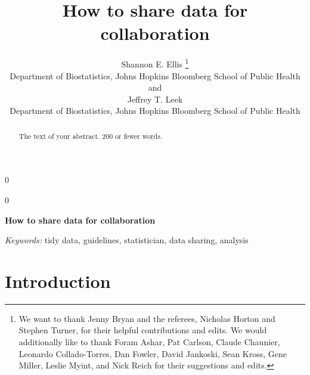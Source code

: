 \documentclass[12pt]{article}
\newcommand{\blind}{0}
\begin{document}
\def\spacingset#1{\renewcommand{\baselinestretch}%
{#1}\small\normalsize} \spacingset{1}



\blind
{
  \title{\bf How to share data for collaboration}

  \author{
        Shannon E. Ellis \thanks{We want to thank Jenny Bryan and the referees, Nicholas Horton and
Stephen Turner, for their helpful contributions and edits. We would
additionally like to thank Foram Ashar, Pat Carlson, Claude Chaunier,
Leonardo Collado-Torres, Dan Fowler, David Jankoski, Sean Kross, Gene
Miller, Leslie Myint, and Nick Reich for their suggestions and edits.} \\
    Department of Biostatistics, Johns Hopkins Bloomberg School of Public
    Health\\
     and \\     Jeffrey T. Leek \\
    Department of Biostatistics, Johns Hopkins Bloomberg School of Public
    Health\\
      }
  \maketitle
} \fi

\blind
{
  \bigskip
  \bigskip
  \bigskip
  \begin{center}
    {\LARGE\bf How to share data for collaboration}
  \end{center}
  \medskip
} \fi

\bigskip
\begin{abstract}
The text of your abstract. 200 or fewer words.
\end{abstract}

\noindent%
{\it Keywords:} tidy data, guidelines, statistician, data sharing, analysis
\vfill

\newpage
\spacingset{1.45} %

\section{Introduction}\label{introduction}
\end{document}
